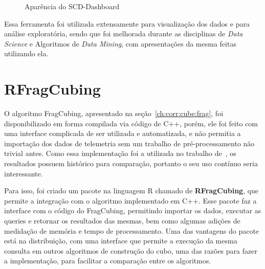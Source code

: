 \begin{figure}[ht]
	\caption{Aparência do SCD-Dashboard}
	\vspace{6mm}
	\begin{center}
	\end{center}
	\vspace{4mm}
	\legenda{}
	\label{fig:scddashboard}
\end{figure}

Essa ferramenta foi utilizada extensamente para visualização dos dados e para análise exploratória, sendo que foi melhorada durante as disciplinas de \textit{Data Science} e Algoritmos de \textit{Data Mining}, com apresentações da mesma feitas utilizando ela.

\section{RFragCubing}
\label{ch:impl:rfrag}

O algoritmo FragCubing, apresentado na seção~\ref{ch:corr:cube:frag}, foi disponibilizado em forma compilada via código de C++, porém, ele foi feito com uma interface complicada de ser utilizada e automatizada, e não permitia a importação dos dados de telemetria sem um trabalho de pré-processamento não trivial antes.
Como essa implementação foi a utilizada no trabalho de~\cite{silva:2015:abordagensParaCubo}, os resultados possuem histórico para comparação, portanto o seu uso contínuo seria interessante.

Para isso, foi criado um pacote na linguagem R chamado de \textbf{RFragCubing}, que permite a integração com o algoritmo implementado em C++.
Esse pacote faz a interface com o código do FragCubing, permitindo importar os dados, executar as queries e retornar os resultados das mesmas, bem como algumas adições de medidação de memória e tempo de processamento.
Uma das vantagens do pacote está na distribuição, com uma interface que permite a execução da mesma consulta em outros algoritmos de construção do cubo, uma das razões para fazer a implementação, para facilitar a comparação entre os algoritmos.

